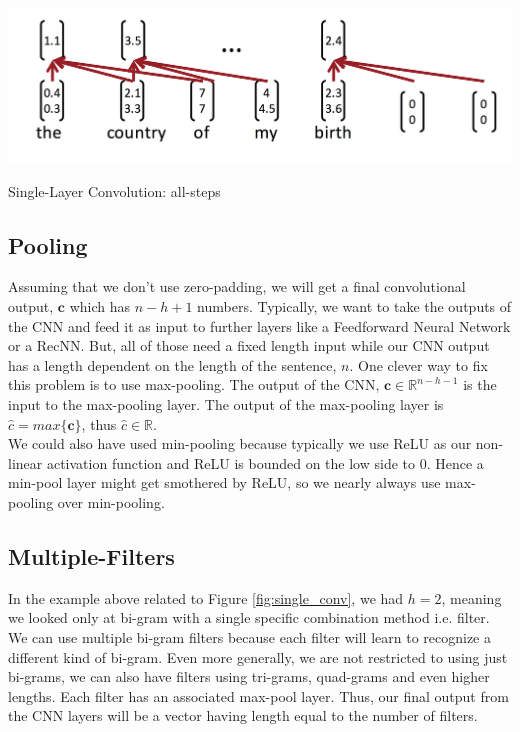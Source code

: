 \documentclass{tufte-handout}
\begin{document}
\begin{marginfigure}%
  \includegraphics[width=\linewidth]{single-conv-complete}
  \caption{Single-Layer Convolution: all-steps}
  \label{fig:single_conv_complete}
\end{marginfigure}

\subsection{Pooling}
Assuming that we don't use zero-padding, we will get a final convolutional output, $\textbf{c}$ which has $n-h+1$ numbers. Typically, we want to take the outputs of the CNN and feed it as input to further layers like a Feedforward Neural Network or a RecNN. But, all of those need a fixed length input while our CNN output has a length dependent on the length of the sentence, $n$. One clever way to fix this problem is to use max-pooling. The output of the CNN, $\textbf{c}\in \mathbb{R}^{n-h-1}$ is the input to the max-pooling layer. The output of the max-pooling layer is $\hat{c}=max\{\textbf{c}\}$, thus $\hat{c}\in \mathbb{R}$. \\
We could also have used min-pooling because typically we use ReLU as our non-linear activation function and ReLU is bounded on the  low side to 0. Hence a min-pool layer might get smothered by ReLU, so we nearly always use max-pooling over min-pooling.

\subsection{Multiple-Filters}
In the example above related to Figure \ref{fig:single_conv}, we had $h=2$, meaning we looked only at bi-gram with a single specific combination method i.e. filter. We can use multiple bi-gram filters because each filter will learn to recognize a different kind of bi-gram. Even more generally, we are not restricted to using just bi-grams, we can also have filters using tri-grams, quad-grams and even higher lengths. Each filter has an associated max-pool layer. Thus, our final output from the CNN layers will be a vector having length equal to the number of filters.
\end{document}
